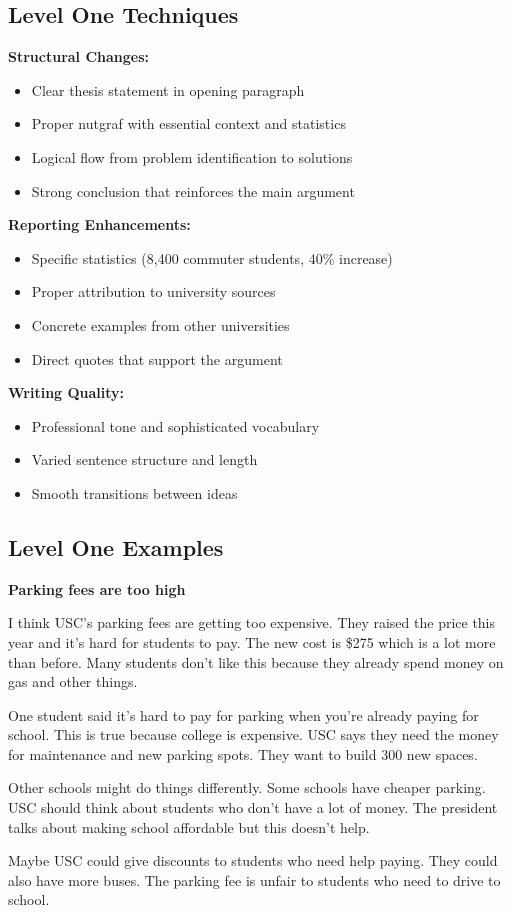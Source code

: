 \documentclass[12pt]{article}
\begin{document}
\newpage
\subsection{Level One Techniques}

\noindent\textbf{Structural Changes:}
\begin{itemize}
    \item Clear thesis statement in opening paragraph
    \item Proper nutgraf with essential context and statistics
    \item Logical flow from problem identification to solutions
    \item Strong conclusion that reinforces the main argument
\end{itemize}

\noindent\textbf{Reporting Enhancements:}
\begin{itemize}
    \item Specific statistics (8,400 commuter students, 40\% increase)
    \item Proper attribution to university sources
    \item Concrete examples from other universities
    \item Direct quotes that support the argument
\end{itemize}

\noindent\textbf{Writing Quality:}
\begin{itemize}
    \item Professional tone and sophisticated vocabulary
    \item Varied sentence structure and length
    \item Smooth transitions between ideas
\end{itemize}

\subsection{Level One Examples}

\begin{originalversion}

\textbf{Parking fees are too high}

I think USC's parking fees are getting too expensive. They raised the price this year and it's hard for students to pay. The new cost is \$275 which is a lot more than before. Many students don't like this because they already spend money on gas and other things.

One student said it's hard to pay for parking when you're already paying for school. This is true because college is expensive. USC says they need the money for maintenance and new parking spots. They want to build 300 new spaces.

Other schools might do things differently. Some schools have cheaper parking. USC should think about students who don't have a lot of money. The president talks about making school affordable but this doesn't help.

Maybe USC could give discounts to students who need help paying. They could also have more buses. The parking fee is unfair to students who need to drive to school.
\end{originalversion}
\end{document}
